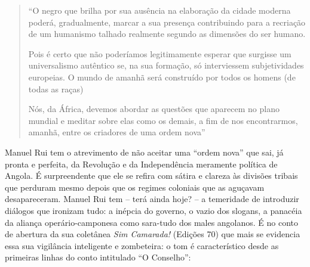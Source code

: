 \documentclass[
  letterpaper,
  DIV=11,
  numbers=noendperiod]{scrreprt}
\begin{document}
\begin{quote}
``O negro que brilha por sua ausência na elaboração da cidade moderna
poderá, gradualmente, marcar a sua presença contribuindo para a
recriação de um humanismo talhado realmente segundo as dimensões do ser
humano.

Pois é certo que não poderíamos legitimamente esperar que surgisse um
universalismo autêntico se, na sua formação, só interviessem
subjetividades europeias. O mundo de amanhã será construído por todos os
homens (de todas as raças)

Nós, da África, devemos abordar as questões que aparecem no plano
mundial e meditar sobre elas como os demais, a fim de nos encontrarmos,
amanhã, entre os criadores de uma ordem nova''
\end{quote}

Manuel Rui tem o atrevimento de não aceitar uma ``ordem nova'' que sai,
já pronta e perfeita, da Revolução e da Independência meramente política
de Angola. É surpreendente que ele se refira com sátira e clareza às
divisões tribais que perduram mesmo depois que os regimes coloniais que
as aguçavam desapareceram. Manuel Rui tem -- terá ainda hoje? -- a
temeridade de introduzir diálogos que ironizam tudo: a inépcia do
governo, o vazio dos slogans, a panacéia da aliança operário-camponesa
como sara-tudo dos males angolanos. É no conto de abertura da sua
coletânea \emph{Sim Camarada!} (Edições 70) que mais se evidencia essa
sua vigilância inteligente e zombeteira: o tom é característico desde as
primeiras linhas do conto intitulado ``O Conselho'':
\end{document}
